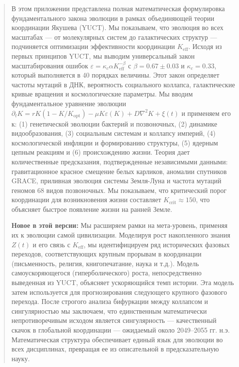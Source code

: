 \documentclass[12pt,a4paper]{article}
\theoremstyle{remark}
\newcommand{\Keff}{K_{\mathrm{eff}}}
\newcommand{\kappac}{\kappa_c}
\newcommand{\eps}{\varepsilon}
\begin{document}
\begin{titlepage}
\begin{center}
			\begin{minipage}{0.9\textwidth}
				\begin{abstract}
					\noindent
					В этом приложении представлена полная математическая формулировка фундаментального закона эволюции в рамках объединяющей теории координации Якушева (YUCT). Мы показываем, что эволюция во всех масштабах — от молекулярных систем до галактических структур — подчиняется оптимизации эффективности координации $\Keff$. Исходя из первых принципов YUCT, мы выводим универсальный закон масштабирования ошибок $\eps = \kappac \alpha \Keff^{-\beta}$ с $\beta = 0.67 \pm 0.03$ и $\kappac = 0.33$, который выполняется в 40 порядках величины. Этот закон определяет частоты мутаций в ДНК, вероятность социального коллапса, галактические кривые вращения и космологические параметры. Мы вводим фундаментальное уравнение эволюции $\partial_t K = rK(1-K/K_{\mathrm{opt}}) - \mu K \eps(K) + D\nabla^2 K + \xi(t)$ и применяем его к: (1) генетической эволюции бактерий и позвоночных, (2) динамике видообразования, (3) социальным системам и коллапсу империй, (4) космологической инфляции и формированию структуры, (5) ядерным цепным реакциям и (6) происхождению жизни. Теория дает количественные предсказания, подтвержденные независимыми данными: гравитационное красное смещение белых карликов, аномалии спутников GRACE, приливная эволюция системы Земля-Луна и частота мутаций геномов 68 видов позвоночных. Мы показываем, что критический порог координации для возникновения жизни составляет $K_{\mathrm{crit}} \approx 150$, что объясняет быстрое появление жизни на ранней Земле.
					
					\noindent
					\textbf{Новое в этой версии:} Мы расширяем рамки на мета-уровень, применяя их к эволюции самой цивилизации. Моделируя рост накопленного знания $Z(t)$ и его связь с $K_{\text{eff}}$, мы идентифицируем ряд исторических фазовых переходов, соответствующих крупным прорывам в координации (письменность, религия, книгопечатание, наука и т.д.). Модель самоускоряющегося (гиперболического) роста, непосредственно выведенная из YUCT, объясняет ускоряющийся темп истории. Эта модель затем используется для прогнозирования следующего крупного фазового перехода. После строгого анализа бифуркации между коллапсом и сингулярностью мы заключаем, что единственным математически непротиворечивым исходом является сингулярность — качественный скачок в глобальной координации — ожидаемый около 2049–2055 гг. н.э. Математическая структура обеспечивает единый язык для эволюции во всех дисциплинах, превращая ее из описательной в предсказательную науку.
				\end{abstract}
			\end{minipage}
			

\end{center}
\end{titlepage}
\end{document}
